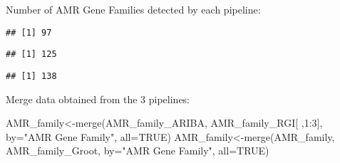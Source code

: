 \documentclass[
]{article}
\newenvironment{Shaded}{\begin{snugshade}}{\end{snugshade}}
\newcommand{\AttributeTok}[1]{\textcolor[rgb]{0.77,0.63,0.00}{#1}}
\newcommand{\ConstantTok}[1]{\textcolor[rgb]{0.00,0.00,0.00}{#1}}
\newcommand{\DecValTok}[1]{\textcolor[rgb]{0.00,0.00,0.81}{#1}}
\newcommand{\FunctionTok}[1]{\textcolor[rgb]{0.00,0.00,0.00}{#1}}
\newcommand{\NormalTok}[1]{#1}
\newcommand{\OtherTok}[1]{\textcolor[rgb]{0.56,0.35,0.01}{#1}}
\newcommand{\SpecialCharTok}[1]{\textcolor[rgb]{0.00,0.00,0.00}{#1}}
\newcommand{\StringTok}[1]{\textcolor[rgb]{0.31,0.60,0.02}{#1}}
\begin{document}
Number of AMR Gene Families detected by each pipeline:

\begin{Shaded}
\end{Shaded}

\begin{verbatim}
## [1] 97
\end{verbatim}

\begin{Shaded}
\end{Shaded}

\begin{verbatim}
## [1] 125
\end{verbatim}

\begin{Shaded}
\end{Shaded}

\begin{verbatim}
## [1] 138
\end{verbatim}

Merge data obtained from the 3 pipelines:

\begin{Shaded}
\begin{Highlighting}[]
\NormalTok{AMR\_family}\OtherTok{\textless{}{-}}\FunctionTok{merge}\NormalTok{(AMR\_family\_ARIBA, AMR\_family\_RGI[ ,}\DecValTok{1}\SpecialCharTok{:}\DecValTok{3}\NormalTok{], }\AttributeTok{by=}\StringTok{"AMR Gene Family"}\NormalTok{, }\AttributeTok{all=}\ConstantTok{TRUE}\NormalTok{)}
\NormalTok{AMR\_family}\OtherTok{\textless{}{-}}\FunctionTok{merge}\NormalTok{(AMR\_family, AMR\_family\_Groot, }\AttributeTok{by=}\StringTok{"AMR Gene Family"}\NormalTok{, }\AttributeTok{all=}\ConstantTok{TRUE}\NormalTok{)}
\end{Highlighting}
\end{Shaded}
\end{document}
